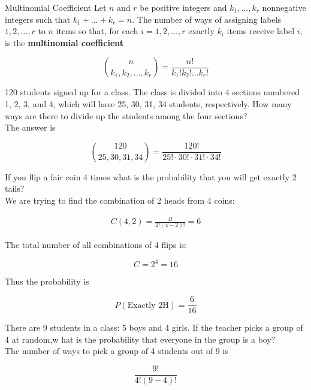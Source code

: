         \begin{theorem}{Multinomial Coefficient}
            Let $n$ and $r$ be positive integers and $k_1, \dots, k_r$ nonnegative integers such that $k_1 + \dots + k_r = n$. The number of ways of assigning labels $1, 2, \dots, r$ to $n$ items so that, for each
            $i=1,2,\dots,r$ exactly $k_i$ items receive label $i$, is the \textbf{multinomial coefficient}

            \[
                \binom{n}{k_1, k_2, \dots, k_r} = \frac{n!}{k_1 ! k_2 ! \dots k_r !}
            \]
        \end{theorem}

        \textit{} 120 students signed up for a class. The class is divided into 4 sections numbered 1, 2, 3, and 4, which will have 25, 30, 31, 34 students, respectively. How many ways are there to
        divide up the students among the four sections? \\

        The answer is

        \[
            \binom{120}{25,30,31,34} = \frac{120!}{25! \cdot 30! \cdot 31! \cdot 34!}
        \]

        \textit{} If you flip a fair coin 4 times what is the probability that you will get exactly 2 tails? \\

        We are trying to find the combination of 2 heads from 4 coins:

        \begin{align*}
            C(4,2) = \frac{4!}{2! (4-2)!} = 6
        \end{align*}

        The total number of all combinations of 4 flips is:

        \[
            C = 2^4 = 16
        \]

        Thus the probability is

        \[
            P(\text{Exactly 2H}) = \frac{6}{16}
        \]

        \textit{} There are 9 students in a class: 5 boys and 4 girls. If the teacher picks a group of 4 at random,w hat is the probability that everyone in the group is a boy? \\

        The number of ways to pick a group of 4 students out of 9 is

        \[
            \frac{9!}{4! (9-4)!}
        \]

